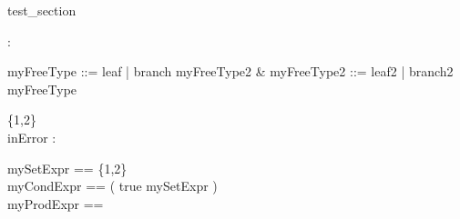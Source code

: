 \begin{zsection}
 \SECTION test\_section
\end{zsection}


\begin{zed}
[ \arithmos ]
\end{zed}

\begin{zed}
  [A,B]
\end{zed}

\begin{axdef}
 \nat : \power \arithmos
\end{axdef}

\begin{zed}
  myFreeType ::= leaf | branch \ldata myFreeType2 \rdata &
  myFreeType2 ::= leaf2 | branch2 \ldata myFreeType \rdata
\end{zed}

\begin{axdef}
  \{1,2\}\\
  inError : \nat
\end{axdef}

\begin{zed}
  mySetExpr == \{1,2\}\\
  myCondExpr == ( \IF true \THEN \nat \ELSE mySetExpr )\\
  myProdExpr == \nat \cross \nat \cross \nat
\end{zed}
